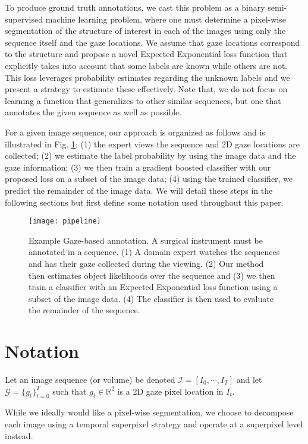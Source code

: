 To produce ground truth annotations, we cast this problem as a binary semi-supervised
machine learning problem, where one must determine a pixel-wise segmentation of the structure of interest in each of the images using only the sequence itself and the gaze locations.
We assume that gaze locations correspond to the structure and propose a novel Expected Exponential loss function that explicitly takes into account that some labels are known while others are not.
This loss leverages probability estimates regarding the unknown labels and we present a strategy to estimate these effectively.
Note that, we do not focus on learning a function that generalizes to other similar sequences, but one that annotates the given sequence as well as possible.

For a given image sequence, our approach is organized as follows and is illustrated in Fig. \ref{fig:eel_pipeline}:
(1) the expert views the sequence and 2D gaze locations are collected; (2) we estimate the label
probability by using the image data and the gaze information; (3) we then train a gradient
boosted classifier with our proposed loss on a subset of the image data; (4) using the trained
classifier, we predict the remainder of the image data. We will detail these steps in the following
sections but first define some notation used throughout this paper.

\begin{figure}[h]
\texttt{[image: pipeline]}
\caption{Example Gaze-based annotation.
  A surgical instrument must be annotated in a sequence.
  (1) A domain expert watches the sequences and has their gaze collected during the
  viewing.
  (2) Our method then estimates object likelihoods over the sequence and (3) we then
train a classifier with an Expected Exponential loss function using a subset of the image data.
(4) The classifier is then used to evaluate the remainder of the sequence.}
\label{fig:eel_pipeline}
\end{figure}

\section{Notation}
Let an image sequence (or volume) be denoted $\mathcal{I} = [I_{0}, \cdots , I_{T}]$ and let $\mathcal{G} = \{g_{t} \}^{T}_{t=0}$ such that $g_t\in \mathbb{R}^{2}$ is a 2D gaze pixel location in $I_{t}$.

While we ideally would like
a pixel-wise segmentation, we choose to decompose each image using a temporal superpixel
strategy \cite{chang13} and operate at a superpixel level instead.

